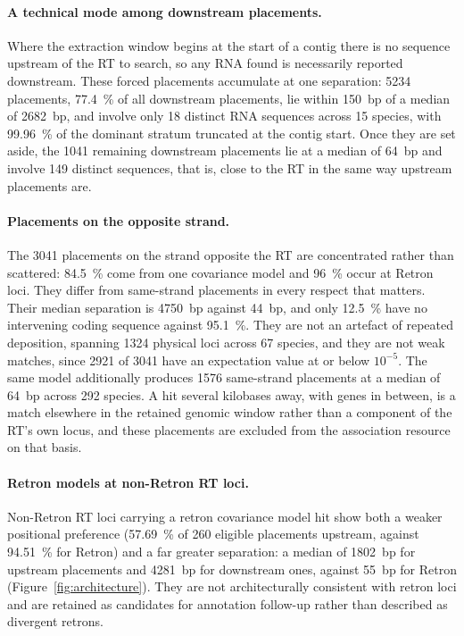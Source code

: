 \paragraph{A technical mode among downstream placements.} Where the extraction window begins at the
start of a contig there is no sequence upstream of the RT to search, so any RNA found is necessarily
reported downstream. These forced placements accumulate at one separation: \num{5234} placements,
\SI{77.4}{\percent} of all downstream placements, lie within 150~bp of a median of \num{2682}~bp,
and involve only 18 distinct RNA sequences across 15 species, with \SI{99.96}{\percent} of the
dominant stratum truncated at the contig start. Once they are set aside, the \num{1041} remaining
downstream placements lie at a median of 64~bp and involve 149 distinct sequences, that is, close to
the RT in the same way upstream placements are.

\paragraph{Placements on the opposite strand.} The \num{3041} placements on the strand opposite the
RT are concentrated rather than scattered: \SI{84.5}{\percent} come from one covariance model and
\SI{96}{\percent} occur at Retron loci. They differ from same-strand placements in every respect
that matters. Their median separation is \num{4750}~bp against 44~bp, and only \SI{12.5}{\percent}
have no intervening coding sequence against \SI{95.1}{\percent}. They are not an artefact of
repeated deposition, spanning \num{1324} physical loci across 67 species, and they are not weak
matches, since \num{2921} of \num{3041} have an expectation value at or below $10^{-5}$. The same
model additionally produces \num{1576} same-strand placements at a median of 64~bp across 292
species. A hit several kilobases away, with genes in between, is a match elsewhere in the retained
genomic window rather than a component of the RT's own locus, and these placements are excluded
from the association resource on that basis.

\paragraph{Retron models at non-Retron RT loci.} Non-Retron RT loci carrying a retron covariance
model hit show both a weaker positional preference (\SI{57.69}{\percent} of 260 eligible placements
upstream, against \SI{94.51}{\percent} for Retron) and a far greater separation: a median of
\num{1802}~bp for upstream placements and \num{4281}~bp for downstream ones, against 55~bp for
Retron (Figure~\ref{fig:architecture}). They are not architecturally consistent with retron loci and
are retained as candidates for annotation follow-up rather than described as divergent retrons.

